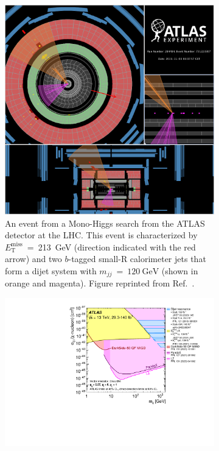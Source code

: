 \begin{figure}[!ht]
     \centering
     \begin{subfigure}{0.42\textwidth}
         \centering
         \includegraphics[width=\textwidth]{figures/DMOverview/MonoXEventViewer.png}
         \caption{An event from a Mono-Higgs search from the ATLAS detector at the LHC. This event is characterized by $E^{\text{miss}}_\text{T}$~=~213~GeV (direction indicated with the red arrow) and two $b$-tagged small-R calorimeter jets that form a dijet system with $m_{jj}~=~120~\text{GeV}$ (shown in orange and magenta). Figure reprinted from Ref.~\cite{ATLAS:2016btj}.}
         \label{fig:DMOverview/Mono-XEventViewer}
     \end{subfigure}
     \hfill
     \begin{subfigure}{0.56\textwidth}
         \centering
         \includegraphics[width=\textwidth]{figures/DMOverview/ATLASDMSearch.pdf}

\end{subfigure}
\end{figure}
